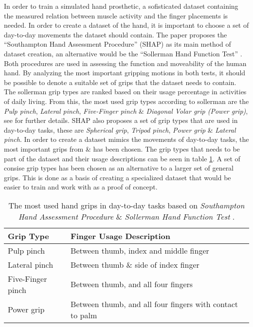 \documentclass[../main.tex]{subfiles}
\begin{document}
In order to train a simulated hand prosthetic, a sofisticated dataset containing the measured relation between muscle activity and the finger placements is needed.
In order to create a dataset of the hand, it is important to choose a set of day-to-day movements the dataset should contain.
The paper \cite{KeunTaeKim2021} proposes the ``Southampton Hand Assessment Procedure'' (SHAP) \cite{shap} as its main method of dataset creation, an alternative would be the ``Sollerman Hand  Function Test''  \cite{sollerman}.
Both procedures are used in assessing the function and moveability of the human hand.
By analyzing the most important gripping motions in both tests, it should be possible to denote a suitable set of grips that the dataset needs to contain.
The sollerman grip types are ranked based on their usage percentage in activities of daily living.
From this, the most used grip types according to sollerman are the \textit{Pulp pinch}, \textit{Lateral pinch}, \textit{Five-Finger pinch} \& \textit{Diagonal Volar grip (Power grip)}, see \cite{sollerman} for further details.
SHAP also proposes a set of grip types that are used in day-to-day tasks, these are \textit{Spherical grip}, \textit{Tripod pinch}, \textit{Power grip} \& \textit{Lateral pinch}.
In order to create a dataset mimics the movements of day-to-day tasks, the most important grips from \cite{sollerman} \& \cite{shap} has been chosen.
The grip types that needs to be part of the dataset and their usage descriptions can be seen in table \ref{tab:grips}.
A set of consise grip types has been chosen as an alternative to a larger set of general grips.
This is done as a basis of creating a specialized dataset that would be easier to train and work with as a proof of concept.

\begin{table}[H]
\begin{center}
\begin{tabular}{ |l|l| } 
 \hline
 Grip Type & Finger Usage Description \\ 
 \hline
 Pulp pinch & Between thumb, index and middle finger \\ 
 Lateral pinch & Between thumb \& side of index finger \\ 
 Five-Finger pinch & Between thumb, and all four fingers \\ 
 Power grip & Between thumb, and all four fingers with contact to palm \\ 
 \hline
\end{tabular}
\caption{The most used hand grips in day-to-day tasks based on \textit{Southampton Hand Assessment Procedure} \cite{shap} \& \textit{Sollerman Hand Function Test} \cite{sollerman}.}
\label{tab:grips}
\end{center}
\end{table}
\end{document}
